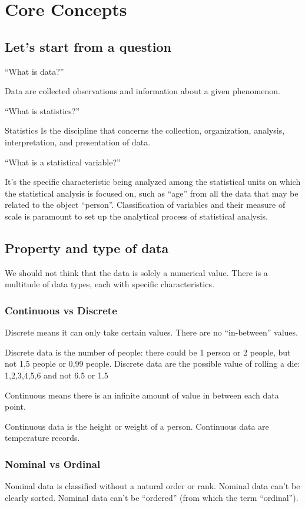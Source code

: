 \documentclass{article}
\begin{document}
\section{Core Concepts}
\subsection{Let's start from a question}
“What is data?”

Data are collected observations and information about a given phenomenon.

“What is statistics?”

Statistics Is the discipline that concerns the collection, organization, analysis, interpretation, and presentation of data.

“What is a statistical variable?”

It’s the specific characteristic being analyzed among the statistical units on which the statistical analysis is focused on, such as “age” from all the data that may be related to the object “person”. Classification of variables and their measure of scale is paramount to set up the analytical process of statistical analysis. 

\subsection{Property and type of data}

We should not think that the data is solely a numerical value. There is a multitude of data types, each with specific characteristics. 

\subsubsection{Continuous vs Discrete}
Discrete means it can only take certain values. There are no “in-between” values. 

Discrete data is the number of people: there could be 1 person or 2 people, but not 1,5 people or 0,99 people. 
Discrete data are the possible value of rolling a die: 1,2,3,4,5,6 and not 6.5 or 1.5

Continuous means there is an infinite amount of value in between each data point.

Continuous data is the height or weight of a person.
Continuous data are temperature records. 
 
\subsubsection{Nominal vs Ordinal}
Nominal data is classified without a natural order or rank. Nominal data can’t be clearly sorted. 
Nominal data can’t be “ordered” (from which the term “ordinal”).
\end{document}
